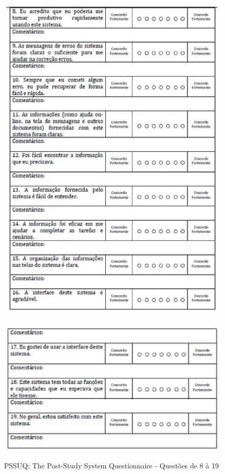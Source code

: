 \begin{figure}[!h]
    \centering
    \includegraphics[keepaspectratio=true,scale=0.60]
      {figuras/pssuq02.eps}
    \label{pssuq}
\end{figure}

\begin{figure}[!h]
    \centering
    \includegraphics[keepaspectratio=true,scale=0.60]
      {figuras/pssuq03.eps}
    \label{pssuq}
	\caption{PSSUQ: The Post-Study System Questionnaire - Questões de 8 à 19}
\end{figure}

